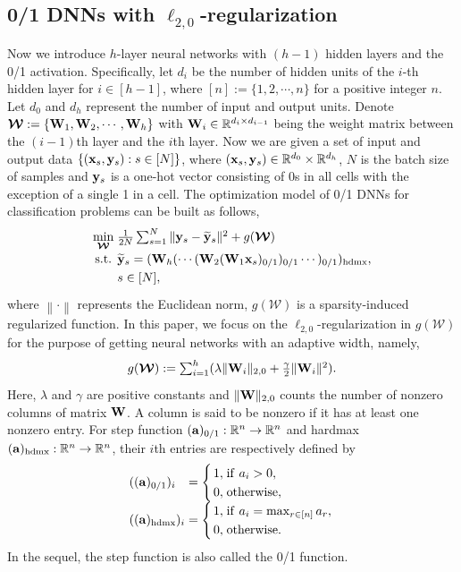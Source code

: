 \documentclass[journal]{IEEEtran}
\newcommand{\ba}{\begin{array}}
\newcommand{\ea}{\end{array}}
\newcommand{\be}{\begin{equation}}
\newcommand{\ee}{\end{equation}}
\def\R{\mathbb{R}}
\def\W{{\bf W}}
\def\CW{{\boldsymbol{\mathcal W}}}
\def\a{{\bf a}}
\def\hd{{\rm hdmx}}
\def\x{{\bf x}}
\def\y{{\bf y}}
\begin{document}
\subsection{0/1 DNNs with $\ell_{2,0}$-regularization}
Now we introduce $h$-layer neural networks with $(h-1)$ hidden layers and  the 0/1  activation. Specifically, let $d_i$ be the number of hidden units of the $i$-th hidden layer for $i\in[h-1]$, where $[n]:=\{1,2,\cdots,n\}$ for a positive integer $n$. Let $d_0$ and $d_h$ represent the number of input and output units. Denote $\CW:=\{\W_1,\W_2,\cdots,\W_h\}$ with $\W_i\in \R^{d_{i}\times d_{i-1}}$ being the weight matrix between the $(i-1)$th layer and the $i$th layer. Now we are given a set of input and output data $\{(\x_s,\y_s): s\in[N]\}$, where $(\x_s,\y_s)\in\R^{d_0}\times\R^{d_h}$, $N$ is the batch size of samples and $\y_s$ is a one-hot vector consisting of 0s in all cells with the exception of a single 1 in a cell. The optimization model of 0/1  DNNs for classification problems can be built as follows,
\be\label{OP}
 \arraycolsep=1.4pt\def\arraystretch{1.25}
\ba{cl}
\min\limits_{\CW} &\frac{1}{2N}\sum_{s=1}^N \| \y_s-{\widetilde \y}_s\|^{2} +   g(\CW) \\
{\rm s.t.}& {\widetilde \y}_s=(\W_h(\cdots(\W_2(\W_1\x_s)_{0/1})_{0/1}\cdots)_{0/1})_{\hd},\\
&s\in[N],
\ea
\ee
where $\left\|\cdot\right\|$ represents the Euclidean norm, $g(\CW)$ is a sparsity-induced regularized function. In this paper, we focus on the $\ell_{2,0}$-regularization in $g(\CW)$ for the purpose of getting neural networks with an adaptive width, namely,  
\begin{eqnarray*}
\arraycolsep=1.4pt\def\arraystretch{1.25}
\begin{array}{lll}g(\CW):= \sum_{i=1}^h( \lambda \|\W_{i}\|_{2,0}+\frac{\gamma}{2}\|\W_{i}\|^2 ).\end{array}
\end{eqnarray*}
Here, $\lambda$ and $\gamma$ are positive constants and $\|\W\|_{2,0}$ counts the number of nonzero columns of matrix $\W$. A column is said to be nonzero if it has at least one nonzero entry. For step function $(\a)_{0/1}:\R^n\rightarrow\R^n$ and hardmax  $(\a)_{\hd}:\R^n\rightarrow\R^n$,  their $i$th entries are respectively defined by
\begin{eqnarray*}
\arraycolsep=1.4pt\def\arraystretch{1.25}
\begin{array}{lll}
((\a)_{0/1})_i&=&\left\{\begin{array}{lll}
1,& {\rm if}~ a_i > 0,\\
0,& {\rm otherwise},\\
\end{array}\right.\\
 ((\a)_{\hd})_i&=&\left\{\begin{array}{lll}
1,& {\rm if}~a_i=\max_{r\in[n]} a_r,\\
0,& {\rm otherwise}.
\end{array}\right.\end{array}
\end{eqnarray*}
In the sequel,  the step function is also called the 0/1 function. 
\end{document}
